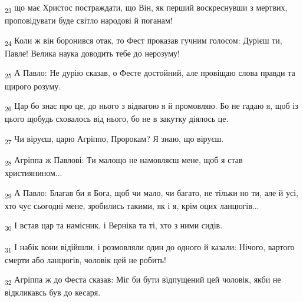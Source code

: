 \begin{tcolorbox}
\textsubscript{23} що має Христос постраждати, що Він, як перший воскреснувши з мертвих, проповідувати буде світло народові й поганам!
\end{tcolorbox}
\begin{tcolorbox}
\textsubscript{24} Коли ж він боронився отак, то Фест проказав гучним голосом: Дурієш ти, Павле! Велика наука доводить тебе до нерозуму!
\end{tcolorbox}
\begin{tcolorbox}
\textsubscript{25} А Павло: Не дурію сказав, о Фесте достойний, але провіщаю слова правди та щирого розуму.
\end{tcolorbox}
\begin{tcolorbox}
\textsubscript{26} Цар бо знає про це, до нього з відвагою я й промовляю. Бо не гадаю я, щоб із цього щобудь сховалось від нього, бо не в закутку діялось це.
\end{tcolorbox}
\begin{tcolorbox}
\textsubscript{27} Чи віруєш, царю Агріппо, Пророкам? Я знаю, що віруєш.
\end{tcolorbox}
\begin{tcolorbox}
\textsubscript{28} Агріппа ж Павлові: Ти малощо не намовляєш мене, щоб я став християнином...
\end{tcolorbox}
\begin{tcolorbox}
\textsubscript{29} А Павло: Благав би я Бога, щоб чи мало, чи багато, не тільки но ти, але й усі, хто чує сьогодні мене, зробились такими, як і я, крім оцих ланцюгів...
\end{tcolorbox}
\begin{tcolorbox}
\textsubscript{30} І встав цар та намісник, і Верніка та ті, хто з ними сидів.
\end{tcolorbox}
\begin{tcolorbox}
\textsubscript{31} І набік вони відійшли, і розмовляли один до одного й казали: Нічого, вартого смерти або ланцюгів, чоловік цей не робить!
\end{tcolorbox}
\begin{tcolorbox}
\textsubscript{32} Агріппа ж до Феста сказав: Міг би бути відпущений цей чоловік, якби не відкликавсь був до кесаря.
\end{tcolorbox}
